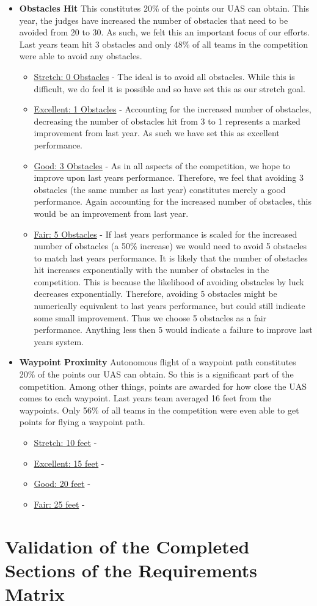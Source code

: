 \documentclass[]{auvsi_doc}
\begin{document}
\begin{itemize}
\item \textbf{Obstacles Hit} This constitutes 20\% of the points our UAS can obtain. This year, the judges have increased the number of obstacles that need to be avoided from 20 to 30. As such, we felt this an important focus of our efforts. Last years team hit 3 obstacles and only 48\% of all teams in the competition were able to avoid any obstacles. 
	\begin{itemize}
	\item \underline{Stretch: 0 Obstacles} - The ideal is to avoid all obstacles. While this is difficult, we do feel it is possible and so have set this as our stretch goal.
	\item \underline{Excellent: 1 Obstacles} -  Accounting for the increased number of obstacles, decreasing the number of obstacles hit from 3 to 1 represents a marked improvement from last year. As such we have set this as excellent performance.
	\item \underline{Good: 3 Obstacles} -  As in all aspects of the competition, we hope to improve upon last years performance. Therefore, we feel that avoiding 3 obstacles (the same number as last year) constitutes merely a good performance. Again accounting for the increased number of obstacles, this would be an improvement from last year.
	\item  \underline{Fair: 5 Obstacles} -  If last years performance is scaled for the increased number of obstacles (a 50\% increase) we would need to avoid 5 obstacles to match last years performance. It is likely that the number of obstacles hit increases exponentially with the number of obstacles in the competition. This is because the likelihood of avoiding obstacles by luck decreases exponentially. Therefore, avoiding 5 obstacles might be numerically equivalent to last years performance, but could still indicate some small improvement. Thus we choose 5 obstacles as a fair performance. Anything less then 5 would indicate a failure to improve last years system.
	\end{itemize}
\item \textbf{Waypoint Proximity} Autonomous flight of a waypoint path constitutes 20\% of the points our UAS can obtain. So this is a significant part of the competition. Among other things, points are awarded for how close the UAS comes to each waypoint. Last years team averaged 16 feet from the waypoints. Only 56\% of all teams in the competition were even able to get points for flying a waypoint path.
	\begin{itemize}
	\item \underline{Stretch: 10 feet} - 
	\item \underline{Excellent: 15 feet} -  
	\item \underline{Good: 20 feet} -  
	\item  \underline{Fair: 25 feet} -  
	\end{itemize}
\end{itemize}


\section{Validation of the Completed Sections of the Requirements Matrix}
\end{document}

